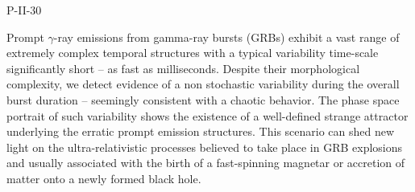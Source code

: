 P-II-30


\bigskip



\bigskip

\noindent Prompt $\gamma$-ray emissions from gamma-ray bursts (GRBs) exhibit a vast range of extremely complex temporal structures with a typical variability time-scale significantly short – as fast as milliseconds. Despite their morphological complexity, we detect evidence of a non stochastic  variability during the overall burst duration – seemingly consistent with a chaotic behavior. The phase space portrait of such variability shows the existence of a well-defined strange attractor underlying the erratic prompt emission structures. This scenario can shed new light on the ultra-relativistic processes believed to take place in GRB explosions and usually associated with the birth of a fast-spinning magnetar or accretion of matter onto a newly formed black hole.

